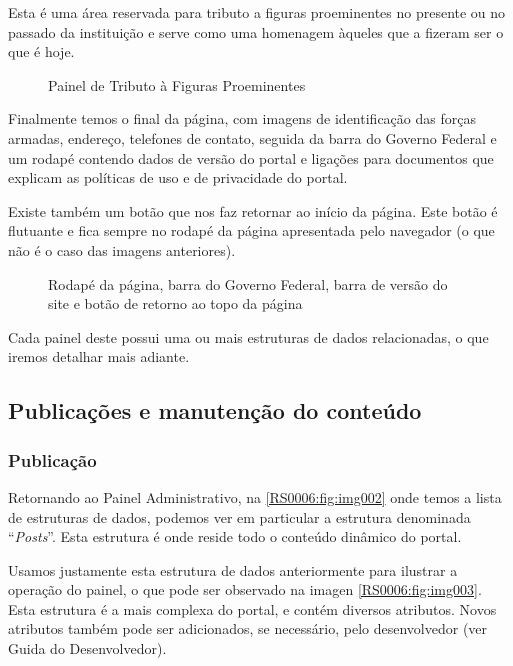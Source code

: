 Esta é uma área reservada para tributo a figuras proeminentes no presente ou no passado da instituição e serve como uma homenagem àqueles que a fizeram ser o que é hoje.

\begin{figure}[!ht]
    \centering
    \caption{Painel de Tributo à Figuras Proeminentes}\label{RS0006:fig:panel-006}
\end{figure}

Finalmente temos o final da página, com imagens de identificação das forças armadas, endereço, telefones de contato, seguida da barra do Governo Federal e um rodapé contendo dados de versão do portal e ligações para documentos que explicam as políticas de uso e de privacidade do portal.

Existe também um botão que nos faz retornar ao início da página. Este botão é flutuante e fica sempre no rodapé da página apresentada pelo navegador (o que não é o caso das imagens anteriores).

\begin{figure}[!ht]
    \centering
    \caption{Rodapé da página, barra do Governo Federal, barra de versão do site e botão de retorno ao topo da página}\label{RS0006:fig:panel-007}
\end{figure}

Cada painel deste possui uma ou mais estruturas de dados relacionadas, o que iremos detalhar mais adiante.

\subsection{Publicações e manutenção do conteúdo}

\subsubsection{Publicação}

Retornando ao Painel Administrativo, na \cref{RS0006:fig:img002} onde temos a lista de estruturas de dados, podemos ver em particular a estrutura denominada ``\textit{Posts}''. Esta estrutura é onde reside todo o conteúdo dinâmico do portal.

Usamos justamente esta estrutura de dados anteriormente para ilustrar a operação do painel, o que pode ser observado na imagen \cref{RS0006:fig:img003}. Esta estrutura é a mais complexa do portal, e contém diversos atributos. Novos atributos também pode ser adicionados, se necessário, pelo desenvolvedor (ver Guida do Desenvolvedor).

